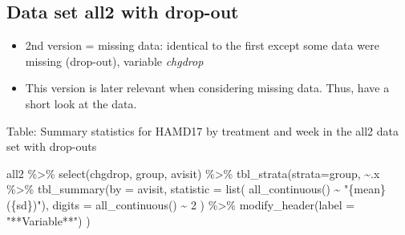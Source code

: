 \documentclass[
  letterpaper,
  DIV=11,
  numbers=noendperiod]{scrreprt}
\newenvironment{Shaded}{\begin{snugshade}}{\end{snugshade}}
\newcommand{\AttributeTok}[1]{\textcolor[rgb]{0.40,0.45,0.13}{#1}}
\newcommand{\DecValTok}[1]{\textcolor[rgb]{0.68,0.00,0.00}{#1}}
\newcommand{\FunctionTok}[1]{\textcolor[rgb]{0.28,0.35,0.67}{#1}}
\newcommand{\NormalTok}[1]{\textcolor[rgb]{0.00,0.23,0.31}{#1}}
\newcommand{\SpecialCharTok}[1]{\textcolor[rgb]{0.37,0.37,0.37}{#1}}
\newcommand{\StringTok}[1]{\textcolor[rgb]{0.13,0.47,0.30}{#1}}
\providecommand{\tightlist}{%
  \setlength{\itemsep}{0pt}\setlength{\parskip}{0pt}}\usepackage{longtable,booktabs,array}
\begin{document}
\hypertarget{data-set-all2-with-drop-out}{%
\subsection{Data set all2 with
drop-out}\label{data-set-all2-with-drop-out}}

\begin{itemize}
\tightlist
\item
  2nd version = missing data: identical to the first except some data
  were missing (drop-out), variable \emph{chgdrop}
\item
  This version is later relevant when considering missing data. Thus,
  have a short look at the data.
\end{itemize}

Table: Summary statistics for HAMD17 by treatment and week in the all2
data set with drop-outs

\begin{Shaded}
\begin{Highlighting}[]
\NormalTok{all2 }\SpecialCharTok{\%\textgreater{}\%}
  \FunctionTok{select}\NormalTok{(chgdrop, group, avisit) }\SpecialCharTok{\%\textgreater{}\%}
  \FunctionTok{tbl\_strata}\NormalTok{(}\AttributeTok{strata=}\NormalTok{group, }
             \SpecialCharTok{\textasciitilde{}}\NormalTok{.x }\SpecialCharTok{\%\textgreater{}\%} 
               \FunctionTok{tbl\_summary}\NormalTok{(}\AttributeTok{by =}\NormalTok{ avisit,}
                           \AttributeTok{statistic =} \FunctionTok{list}\NormalTok{(}
      \FunctionTok{all\_continuous}\NormalTok{() }\SpecialCharTok{\textasciitilde{}} \StringTok{"\{mean\} (\{sd\})"}\NormalTok{), }
      \AttributeTok{digits =} \FunctionTok{all\_continuous}\NormalTok{() }\SpecialCharTok{\textasciitilde{}} \DecValTok{2}\NormalTok{ ) }\SpecialCharTok{\%\textgreater{}\%}
      \FunctionTok{modify\_header}\NormalTok{(}\AttributeTok{label =} \StringTok{"**Variable**"}\NormalTok{)}
\NormalTok{)}
\end{Highlighting}
\end{Shaded}
\end{document}
